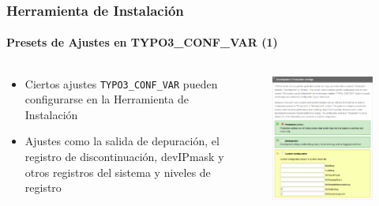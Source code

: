 \begin{frame}[fragile]
	\frametitle{Herramienta de Instalación}
	\framesubtitle{Presets de Ajustes en TYPO3\_CONF\_VAR (1)}

	\begin{columns}[T]
		\begin{column}{.5\textwidth}

			\begin{itemize}
				\item Ciertos ajustes \texttt{TYPO3\_CONF\_VAR} pueden configurarse en la Herramienta de Instalación
				\item Ajustes como la salida de depuración, el registro de discontinuación, devIPmask y otros registros del sistema y niveles de registro
			\end{itemize}

		\end{column}
		\begin{column}{.5\textwidth}

			\begin{figure}\vspace*{-0.4cm}
				\includegraphics[width=0.8\linewidth]{Images/InstallTool/ApplicationContext.png}
			\end{figure}

		\end{column}
	\end{columns}

\end{frame}

